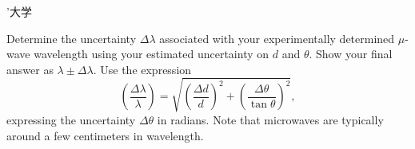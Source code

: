 ’大学\documentclass[addpoints]{physlabs}
\begin{document}
\begin{postlab}
    \filbreak
    \question[1] Determine the uncertainty $\Delta\lambda$ associated with your experimentally determined $\mu$-wave wavelength using your estimated uncertainty on $d$ and $\theta$. Show your final answer as $\lambda\pm\Delta\lambda$. Use the expression
    \begin{equation}
        \left(\frac{\Delta\lambda}{\lambda}\right) = \sqrt{\left(\frac{\Delta d}{d}\right)^2 + \left(\frac{\Delta\theta}{\tan{\theta}}\right)^2},
    \end{equation}
    expressing the uncertainty $\Delta\theta$ in radians. Note that microwaves are typically around a few centimeters in wavelength.
    \begin{solution}[6cm]
    \end{solution}

    
\end{postlab}
\end{document}
